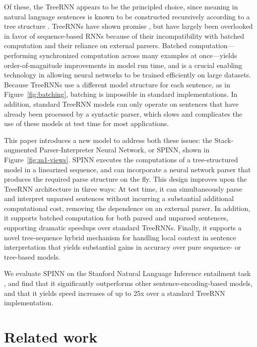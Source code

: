 \documentclass[11pt]{article}
\begin{document}
Of these, the TreeRNN appears to be the principled choice, since meaning in natural language sentences is known to be constructed recursively according to a tree structure \citep[][i.a.]{Dowty07DC}. TreeRNNs have shown promise \citep{tai2015improved,li2015tree,bowman2015trees}, but have largely been overlooked in favor of sequence-based RNNs because of their incompatibility with batched computation and their reliance on external parsers.  Batched computation---performing synchronized computation across many examples at once---yields order-of-magnitude improvements in model run time, and is a crucial enabling technology in allowing neural networks to be trained efficiently on large datasets. Because TreeRNNs use a different model structure for each sentence, as in Figure~\ref{fig:batching}, batching is impossible in standard implementations. In addition, standard TreeRNN models can only operate on sentences that have already been processed by a syntactic parser, which slows and complicates the use of these models at test time for most applications.

This paper introduces a new model to address both these issues: the Stack-augmented Parser-Interpreter Neural Network, or SPINN, shown in Figure~\ref{fig:m1-views}. SPINN executes the computations of a tree-structured model in a linearized sequence, and can incorporate a neural network parser that produces the required parse structure on the fly. This design improves upon the TreeRNN architecture in three ways: At test time, it can simultaneously parse and interpret unparsed sentences without incurring a substantial additional computational cost, removing the dependence on an external parser. In addition, it supports batched computation for both parsed and unparsed sentences, supporting dramatic speedups over standard TreeRNNs. Finally, it supports a novel tree-sequence hybrid mechanism for handling local context in sentence interpretation that yields substantial gains in accuracy over pure sequence- or tree-based models. %

We evaluate SPINN on the Stanford Natural Language Inference entailment task \citep[SNLI,][]{snli:emnlp2015}, and find that it significantly outperforms other sentence-encoding-based models, and that it yields speed increases of up to 25x over a standard TreeRNN implementation.

\section{Related work}
\end{document}
